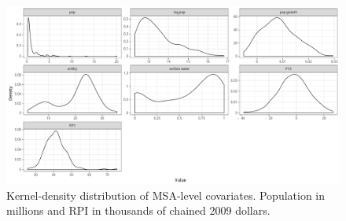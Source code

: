 \documentclass[draft]{agujournal}
\begin{document}

\begin{figure}[H]
\includegraphics[width=6in]{figures_si/msa_vars_distribution-1} \caption[Kernel-density distribution of MSA-level covariates]{Kernel-density distribution of MSA-level covariates. Population in millions and RPI in thousands of chained 2009 dollars.}\label{fig:msa_vars_distribution}
\end{figure}



\end{document}
